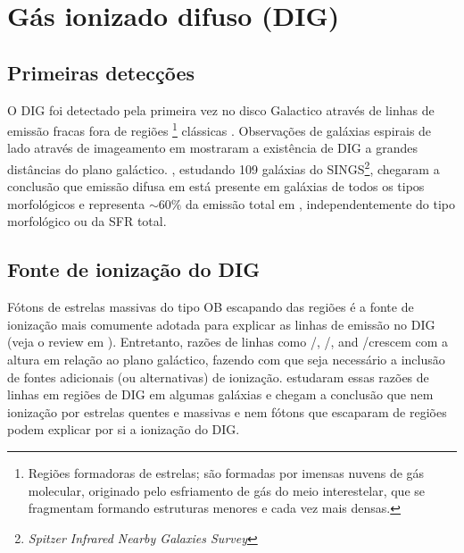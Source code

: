 \section{Gás ionizado difuso (DIG)}
\label{sec:intro:DIG}

\subsection{Primeiras detecções}
\label{sec:intro:DIG:first}
O DIG foi detectado pela primeira vez no disco Galactico através de linhas de emissão fracas fora de regiões \Hii\footnote{Regiões formadoras de estrelas; são formadas por imensas nuvens de gás molecular, originado pelo esfriamento de gás do meio interestelar, que se fragmentam formando estruturas menores e cada vez mais densas.} clássicas \citep{Reynolds.PhD.1971}. Observações de galáxias espirais de lado através de imageamento em \Ha \citep{Dettmar.1990, HoopesWaltGreen.1996, HoopesWaltRand.1999} mostraram a existência de DIG a grandes distâncias do plano galáctico. \cite{Oey.etal.2007}, estudando 109 galáxias do SINGS\footnote{\em Spitzer Infrared Nearby Galaxies Survey}, chegaram a conclusão que emissão difusa em \Ha está presente em galáxias de todos os tipos morfológicos e representa $\sim60\%$ da emissão total em \Ha, independentemente do tipo morfológico ou da SFR total.

\subsection{Fonte de ionização do DIG}
\label{sec:intro:DIG:source}
Fótons de estrelas massivas do tipo OB escapando das regiões \Hii é a fonte de ionização mais comumente adotada para explicar as linhas de emissão no DIG (veja o review em \citealt{Haffner.etal.2009}). Entretanto, razões de linhas como \nii/\Ha, \sii/\Ha, and \oiii/\Hb crescem com a altura em relação ao plano galáctico, fazendo com que seja necessário a inclusão de fontes adicionais (ou alternativas) de ionização. \citet{HoopesWalt.2003} estudaram essas razões de linhas em regiões de DIG em algumas galáxias e chegam a conclusão que nem ionização por estrelas quentes e massivas e nem fótons que escaparam de regiões \hii podem explicar por si a ionização do DIG.

